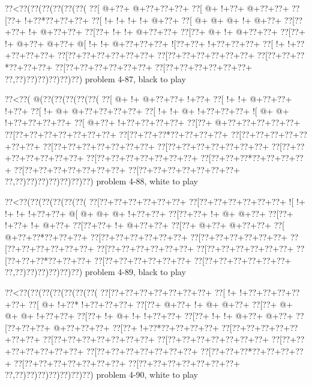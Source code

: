 \vbox{\vbox{\goo
\0??<\0??(\0??(\0??(\0??(\0??(\0??(
\0??[\- @+\0??+\- @+\0??+\0??+\0??+
\0??[\- @+\- !+\0??+\- @+\0??+\0??+
\0??[\0??+\- !+\0??*\0??+\0??+\0??+
\0??[\- !+\- !+\- !+\- !+\- @+\0??+
\0??[\- @+\- @+\- @+\- !+\- @+\0??+
\0??[\0??+\0??+\- !+\- @+\0??+\0??+
\0??[\0??+\- !+\- !+\- @+\0??+\0??+
\0??[\0??+\- @+\- !+\- @+\0??+\0??+
\0??[\0??+\- !+\- @+\0??+\- @+\0??+
\- @[\- !+\- !+\- @+\0??+\0??+\0??+
\- ![\0??+\0??+\- !+\0??+\0??+\0??+
\0??[\- !+\- !+\0??+\0??+\0??+\0??+
\0??[\0??+\0??+\0??+\0??+\0??+\0??+
\0??[\0??+\0??+\0??+\0??+\0??+\0??+
\0??[\0??+\0??+\0??*\0??+\0??+\0??+
\0??[\0??+\0??+\0??+\0??+\0??+\0??+
\0??[\0??+\0??+\0??+\0??+\0??+\0??+
\0??,\0??)\0??)\0??)\0??)\0??)\0??)
}
\hfil problem 4-87, black to play\hfil\break
}

\vbox{\vbox{\goo
\0??<\0??(\- @(\0??(\0??(\0??(\0??(\0??(
\0??[\- @+\- !+\- @+\0??+\0??+\- !+\0??+
\0??[\- !+\- !+\- @+\0??+\0??+\- !+\0??+
\0??[\- !+\- @+\- @+\0??+\0??+\0??+\0??+
\0??[\- !+\- !+\- @+\- !+\0??+\0??+\0??+
\- ![\- @+\- @+\- !+\0??+\0??+\0??+\0??+
\0??[\- @+\0??+\- !+\0??+\0??+\0??+\0??+
\0??[\0??+\- @+\0??+\0??+\0??+\0??+\0??+
\0??[\0??+\0??+\0??+\0??+\0??+\0??+\0??+
\0??[\0??+\0??+\0??*\0??+\0??+\0??+\0??+
\0??[\0??+\0??+\0??+\0??+\0??+\0??+\0??+
\0??[\0??+\0??+\0??+\0??+\0??+\0??+\0??+
\0??[\0??+\0??+\0??+\0??+\0??+\0??+\0??+
\0??[\0??+\0??+\0??+\0??+\0??+\0??+\0??+
\0??[\0??+\0??+\0??+\0??+\0??+\0??+\0??+
\0??[\0??+\0??+\0??*\0??+\0??+\0??+\0??+
\0??[\0??+\0??+\0??+\0??+\0??+\0??+\0??+
\0??[\0??+\0??+\0??+\0??+\0??+\0??+\0??+
\0??,\0??)\0??)\0??)\0??)\0??)\0??)\0??)
}
\hfil problem 4-88, white to play\hfil\break
}

\vbox{\vbox{\goo
\0??<\0??(\0??(\0??(\0??(\0??(\0??(
\0??[\0??+\0??+\0??+\0??+\0??+\0??+
\0??[\0??+\0??+\0??+\0??+\0??+\0??+
\- ![\- !+\- !+\- !+\- !+\0??+\0??+
\- @[\- @+\- @+\- @+\- !+\0??+\0??+
\0??[\0??+\0??+\- !+\- @+\- @+\0??+
\0??[\0??+\- !+\0??+\- !+\- @+\0??+
\0??[\0??+\0??+\- !+\- @+\0??+\0??+
\0??[\0??+\- @+\0??+\- @+\0??+\0??+
\0??[\- @+\0??+\0??*\0??+\0??+\0??+
\0??[\0??+\0??+\0??+\0??+\0??+\0??+
\0??[\0??+\0??+\0??+\0??+\0??+\0??+
\0??[\0??+\0??+\0??+\0??+\0??+\0??+
\0??[\0??+\0??+\0??+\0??+\0??+\0??+
\0??[\0??+\0??+\0??+\0??+\0??+\0??+
\0??[\0??+\0??+\0??*\0??+\0??+\0??+
\0??[\0??+\0??+\0??+\0??+\0??+\0??+
\0??[\0??+\0??+\0??+\0??+\0??+\0??+
\0??,\0??)\0??)\0??)\0??)\0??)\0??)
}
\hfil problem 4-89, black to play\hfil\break
}

\vbox{\vbox{\goo
\0??<\0??(\0??(\0??(\0??(\0??(\0??(\0??(
\0??[\0??+\0??+\0??+\0??+\0??+\0??+\0??+
\0??[\- !+\- !+\0??+\0??+\0??+\0??+\0??+
\0??[\- @+\- !+\0??*\- !+\0??+\0??+\0??+
\0??[\0??+\- @+\0??+\- !+\- @+\- @+\0??+
\0??[\0??+\- @+\- @+\- @+\- !+\0??+\0??+
\0??[\0??+\- !+\- @+\- !+\- !+\0??+\0??+
\0??[\0??+\- !+\- !+\- @+\0??+\- @+\0??+
\0??[\0??+\0??+\0??+\- @+\0??+\0??+\0??+
\0??[\0??+\- !+\0??*\0??+\0??+\0??+\0??+
\0??[\0??+\0??+\0??+\0??+\0??+\0??+\0??+
\0??[\0??+\0??+\0??+\0??+\0??+\0??+\0??+
\0??[\0??+\0??+\0??+\0??+\0??+\0??+\0??+
\0??[\0??+\0??+\0??+\0??+\0??+\0??+\0??+
\0??[\0??+\0??+\0??+\0??+\0??+\0??+\0??+
\0??[\0??+\0??+\0??*\0??+\0??+\0??+\0??+
\0??[\0??+\0??+\0??+\0??+\0??+\0??+\0??+
\0??[\0??+\0??+\0??+\0??+\0??+\0??+\0??+
\0??,\0??)\0??)\0??)\0??)\0??)\0??)\0??)
}
\hfil problem 4-90, white to play\hfil\break
}

